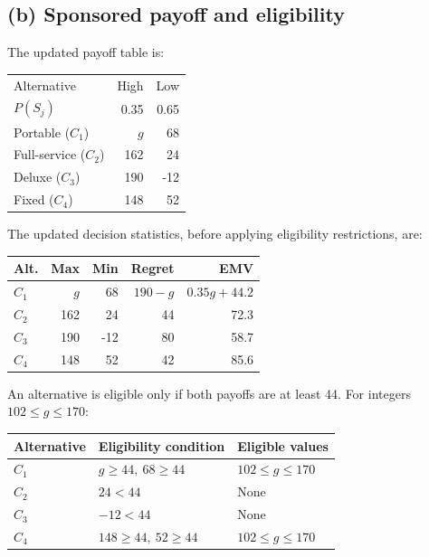 \label{sol:q2b}
\subsection*{(b) Sponsored payoff and eligibility }

The updated payoff table is:

\begin{center}\small\setlength{\tabcolsep}{4pt}
	\begin{tabular}{lrr}\toprule
		Alternative & High & Low\\
		$P(S_j)$ & 0.35 & 0.65\\ \midrule
				Portable ($C_1$) & $g$ & 68\\
		Full-service ($C_2$) & 162 & 24\\
		Deluxe ($C_3$) & 190 & -12\\
		Fixed ($C_4$) & 148 & 52\\
		\bottomrule
	\end{tabular}
\end{center}

The updated decision statistics, before applying
eligibility restrictions, are:

\begin{center}\small\setlength{\tabcolsep}{4pt}
	\begin{tabular}{lrrrr}\toprule
		Alt. & Max & Min & Regret & EMV\\ \midrule
				$C_1$ & $g$ & 68 & $190-g$ & $0.35g+44.2$\\
		$C_2$ & 162 & 24 & 44 & 72.3\\
		$C_3$ & 190 & -12 & 80 & 58.7\\
		$C_4$ & 148 & 52 & 42 & 85.6\\
		\bottomrule
	\end{tabular}
\end{center}

An alternative is eligible only if both payoffs
are at least 44. For integers $102\le g\le170$:

\begin{center}
\begin{tabular}{lll}\toprule
Alternative & Eligibility condition & Eligible values\\\midrule
$C_1$ & $g\ge44,\ 68\ge44$ & $102\le g\le170$\\
$C_2$ & $24<44$ & None\\
$C_3$ & $-12<44$ & None\\
$C_4$ & $148\ge44,\ 52\ge44$ & $102\le g\le170$\\
\bottomrule
\end{tabular}
\end{center}

